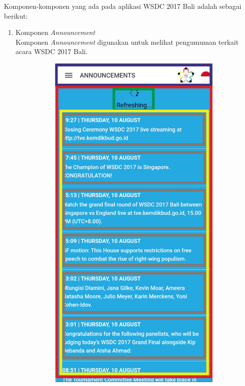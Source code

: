 Komponen-komponen yang ada pada aplikasi WSDC 2017 Bali adalah sebagai berikut:
\begin{enumerate}
	\item Komponen \textit{Announcement} \\
	Komponen \textit{Announcement} digunakan untuk melihat pengumuman terkait acara WSDC 2017 Bali. 
	\begin{figure}[H]
    	\centering
     	\begin{subfigure}[b]{0.43\textwidth}
        	\centering
         	\includegraphics[scale=0.465]{Gambar/AnnouncementsPageWireframe.png}

\end{subfigure}
\end{figure}
\end{enumerate}
